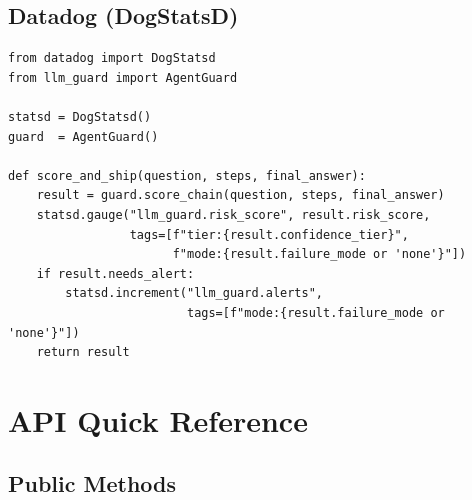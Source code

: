 \documentclass[11pt,a4paper]{article}
\begin{document}
\subsection{Datadog (DogStatsD)}

\begin{lstlisting}
from datadog import DogStatsd
from llm_guard import AgentGuard

statsd = DogStatsd()
guard  = AgentGuard()

def score_and_ship(question, steps, final_answer):
    result = guard.score_chain(question, steps, final_answer)
    statsd.gauge("llm_guard.risk_score", result.risk_score,
                 tags=[f"tier:{result.confidence_tier}",
                       f"mode:{result.failure_mode or 'none'}"])
    if result.needs_alert:
        statsd.increment("llm_guard.alerts",
                         tags=[f"mode:{result.failure_mode or 'none'}"])
    return result
\end{lstlisting}

\section{API Quick Reference}

\subsection{Public Methods}
\end{document}
